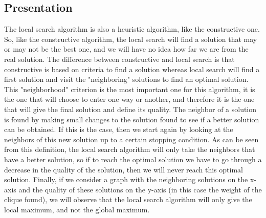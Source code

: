
\subsection{Presentation}

The local search algorithm is also a heuristic algorithm, like the constructive one. 
So, like the constructive algorithm, the local search will find a solution that may 
or may not be the best one, and we will have no idea how far we are from the real 
solution. The difference between constructive and local search is that constructive 
is based on criteria to find a solution whereas local search will find a first 
solution and visit the "neighboring" solutions to find an optimal solution. This 
"neighborhood" criterion is the most important one for this algorithm, it is the 
one that will choose to enter one way or another, and therefore it is the one that 
will give the final solution and define its quality. The neighbor of a solution is 
found by making small changes to the solution found to see if a better solution can 
be obtained. If this is the case, then we start again by looking at the neighbors 
of this new solution up to a certain stopping condition. As can be seen from this 
definition, the local search algorithm will only take the neighbors that have a 
better solution, so if to reach the optimal solution we have to go through a decrease 
in the quality of the solution, then we will never reach this optimal solution. 
Finally, if we consider a graph with the neighboring solutions on the x-axis and 
the quality of these solutions on the y-axis (in this case the weight of the clique 
found), we will observe that the local search algorithm will only give the local 
maximum, and not the global maximum.


\begin{center}
\end{center}


